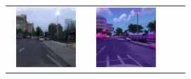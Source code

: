 \documentclass{VUMIFPSbakalaurinis}
\begin{document}
\begin{table}[H]
{\begin{tabular}{|c|c|c|c|}
            \includegraphics[width=100,height=85]{img/diffusion/cycle/7c2090bd-7b48705f} & 
            \includegraphics[width=100,height=85]{img/diffusion/instruct/7c2090bd-7b48705f} \\

\end{tabular}}
\end{table}
\end{document}
